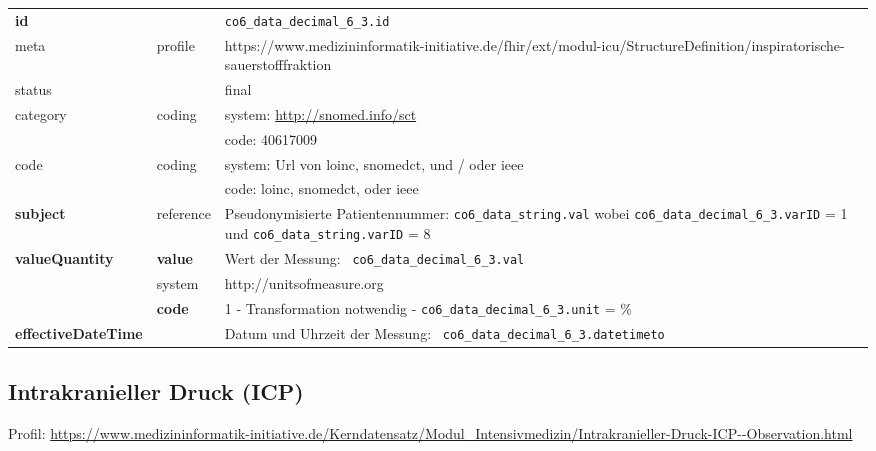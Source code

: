 \begin{longtable}{|l|l|p{7.5cm}|}
	\hline
	\rowcolor{lightgray} \multicolumn{3}{|l|}{Data Mapping (inhaltlich)} \\ \hline
	\textbf{id} &  & \texttt{co6\_data\_decimal\_6\_3.id} \\ \hline
	meta & profile & https://www.medizininformatik-initiative.de/fhir/ext/modul-icu/StructureDefinition/inspiratorische-sauerstofffraktion \\ \hline 
	status &  & final   \\ \hline 
	category & coding & system: \url{http://snomed.info/sct} \\
	\cline{3-3}
	& & code: 40617009 \\ \hline
	code & coding & system: Url von \ac{loinc}, \ac{snomedct}, und / oder \ac{ieee} \\ 
	\cline{3-3} 
	&  & code: \ac{loinc}, \ac{snomedct}, oder \ac{ieee} \\ \hline
	\textbf{subject} & reference & Pseudonymisierte Patientennummer: \texttt{co6\_data\_string.val} wobei \texttt{co6\_data\_decimal\_6\_3.varID} = 1 und \texttt{co6\_data\_string.varID} = 8 \\ \hline
	\textbf{valueQuantity}  & \textbf{value} & Wert der Messung: \texttt{
		co6\_data\_decimal\_6\_3.val} \\
	\cline{2-3}
	& system & http://unitsofmeasure.org \\
	\cline{2-3}
	& \textbf{code} & 1 - Transformation notwendig - \texttt{co6\_data\_decimal\_6\_3.unit} = \%
	\\ \hline
	\textbf{effectiveDateTime}  & & Datum und Uhrzeit der Messung: \texttt{
		co6\_data\_decimal\_6\_3.datetimeto} \\
	\hline
\end{longtable}

\subsection{Intrakranieller Druck (ICP)} 
 Profil: \url{https://www.medizininformatik-initiative.de/Kerndatensatz/Modul_Intensivmedizin/Intrakranieller-Druck-ICP--Observation.html}

